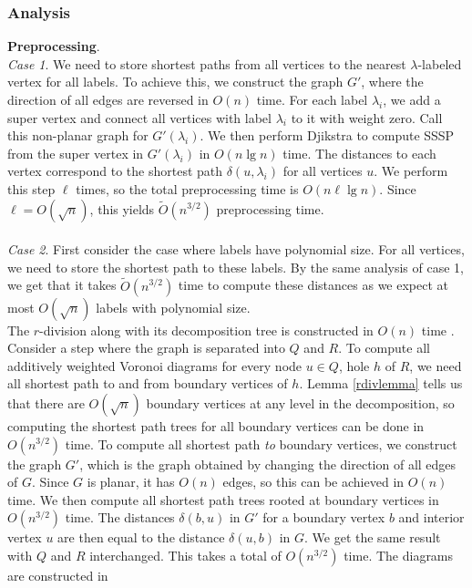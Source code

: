 \subsubsection{Analysis}\label{oracle2analysis}
\textbf{Preprocessing}. \\
\textit{Case 1}. We need to store shortest paths from all vertices to the nearest
$\lambda$-labeled vertex for all labels. To achieve this, we construct the graph $G'$, where the
direction of all edges are reversed in $O(n)$ time. For each label $\lambda_i$, we add a
super vertex and connect all vertices with label $\lambda_i$ to it with weight zero. Call this non-planar
graph for $G'(\lambda_i)$. We then perform Djikstra
\cite{fredman1987fibonacci} to compute SSSP from the super vertex in $G'(\lambda_i)$ in
$O(n\lg n)$ time. The distances to each vertex correspond to the shortest path
$\delta(u,\lambda_i)$ for all vertices $u$. We perform this step $\ell$
times, so the total preprocessing time is $O(n\ell \lg n)$. Since $\ell=O(\sqrt{n})$, this
yields $\tilde{O}(n^{3/2})$ preprocessing time. \\
\\
\textit{Case 2}. First consider the case where labels have polynomial size. For all
vertices, we need to store the shortest path to these labels. By the same analysis of case 1,
we get that it takes $\tilde{O}(n^{3/2})$ time to compute these distances as we expect at
most $O(\sqrt{n})$ labels with polynomial size. \\
The $r$-division along with its decomposition tree is constructed in $O(n)$
time \cite{klein2013structured}. Consider a step where the graph is separated into $Q$
and $R$. To compute all additively weighted Voronoi diagrams for every node $u\in
Q$, hole $h$ of $R$, we need all
shortest path to and from boundary vertices of $h$. Lemma \ref{rdivlemma} tells us that there are
$O(\sqrt{n})$ boundary vertices at any level in the decomposition, so computing the shortest path trees for all
boundary vertices can be done in $O(n^{3/2})$ time. To compute all shortest path \textit{to} boundary vertices, we construct the graph
$G'$, which is the graph obtained by changing the direction of all edges of $G$. Since
$G$ is planar, it has $O(n)$ edges, so this can be achieved in $O(n)$ time. We then
compute all shortest path trees rooted at boundary vertices in $O(n^{3/2})$ time. The
distances $\delta(b,u)$ in $G'$ for a boundary vertex $b$ and interior vertex $u$ are then equal
to the distance $\delta(u,b)$ in $G$. We get the same result with $Q$ and $R$
interchanged. This takes a total of $O(n^{3/2})$ time. The diagrams are constructed in
